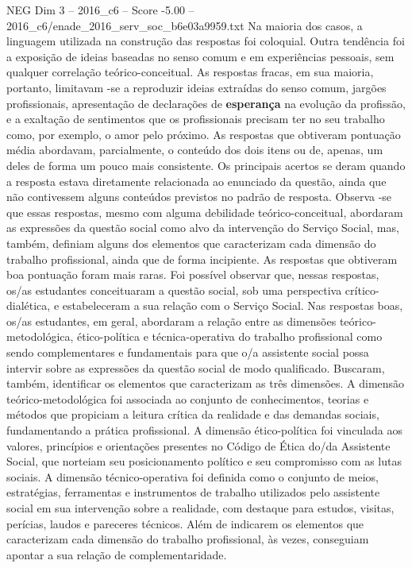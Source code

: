 \begin{textsample}{NEG Dim 3 – 2016\_c6 – Score -5.00 – 2016\_c6/enade\_2016\_serv\_soc\_b6e03a9959.txt}
Na maioria dos casos, a linguagem utilizada na construção das respostas foi coloquial.
Outra tendência foi a exposição de ideias baseadas no senso comum e em experiências pessoais, sem qualquer correlação teórico-conceitual.
As respostas fracas, em sua maioria, portanto, limitavam -se a reproduzir ideias extraídas do senso comum, jargões profissionais, apresentação de declarações de \textbf{esperança} na evolução da profissão, e a exaltação de sentimentos que os profissionais precisam ter no seu trabalho como, por exemplo, o amor pelo próximo.
As respostas que obtiveram pontuação média abordavam, parcialmente, o conteúdo dos dois itens ou de, apenas, um deles de forma um pouco mais consistente.
Os principais acertos se deram quando a resposta estava diretamente relacionada ao enunciado da questão, ainda que não contivessem alguns conteúdos previstos no padrão de resposta.
Observa -se que essas respostas, mesmo com alguma debilidade teórico-conceitual, abordaram as expressões da questão social como alvo da intervenção do Serviço Social, mas, também, definiam alguns dos elementos que caracterizam cada dimensão do trabalho profissional, ainda que de forma incipiente.
As respostas que obtiveram boa pontuação foram mais raras.
Foi possível observar que, nessas respostas, os/as estudantes conceituaram a questão social, sob uma perspectiva crítico-dialética, e estabeleceram a sua relação com o Serviço Social.
Nas respostas boas, os/as estudantes, em geral, abordaram a relação entre as dimensões teórico-metodológica, ético-política e técnica-operativa do trabalho profissional como sendo complementares e fundamentais para que o/a assistente social possa intervir sobre as expressões da questão social de modo qualificado.
Buscaram, também, identificar os elementos que caracterizam as três dimensões.
A dimensão teórico-metodológica foi associada ao conjunto de conhecimentos, teorias e métodos que propiciam a leitura crítica da realidade e das demandas sociais, fundamentando a prática profissional.
A dimensão ético-política foi vinculada aos valores, princípios e orientações presentes no Código de Ética do/da Assistente Social, que norteiam seu posicionamento político e seu compromisso com as lutas sociais.
A dimensão técnico-operativa foi definida como o conjunto de meios, estratégias, ferramentas e instrumentos de trabalho utilizados pelo assistente social em sua intervenção sobre a realidade, com destaque para estudos, visitas, perícias, laudos e pareceres técnicos.
Além de indicarem os elementos que caracterizam cada dimensão do trabalho profissional, às vezes, conseguiam apontar a sua relação de complementaridade.

\end{textsample}
